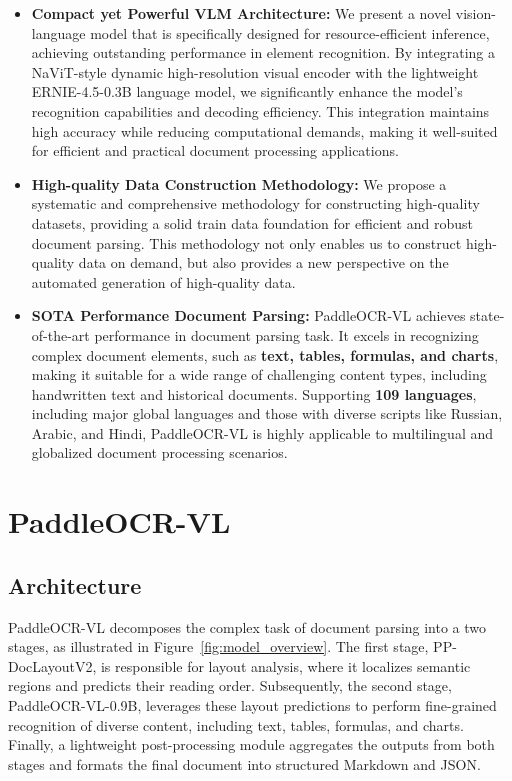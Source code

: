 \documentclass[11pt, a4paper,logo,  copyright, nonumbering]{paddleocr}
\begin{document}
\begin{itemize}

    \item \textbf{Compact yet Powerful VLM Architecture:} We present a novel vision-language model that is specifically designed for resource-efficient inference, achieving outstanding performance in element recognition. By integrating a NaViT-style dynamic high-resolution visual encoder with the lightweight ERNIE-4.5-0.3B language model, we significantly enhance the model’s recognition capabilities and decoding efficiency. This integration maintains high accuracy while reducing computational demands, making it well-suited for efficient and practical document processing applications.

    \item \textbf{High-quality Data Construction Methodology:} We propose a systematic and comprehensive methodology for constructing high-quality datasets, providing a solid train data foundation for efficient and robust document parsing. This methodology not only enables us to construct high-quality data on demand, but also provides a new perspective on the automated generation of high-quality data.

    \item \textbf{SOTA Performance Document Parsing:} PaddleOCR-VL achieves state-of-the-art performance in document parsing task. It excels in recognizing complex document elements, such as \textbf{text, tables, formulas, and charts}, making it suitable for a wide range of challenging content types, including handwritten text and historical documents. Supporting \textbf{109 languages}, including major global languages and those with diverse scripts like Russian, Arabic, and Hindi, PaddleOCR-VL is highly applicable to multilingual and globalized document processing scenarios. 



\end{itemize}


\section{PaddleOCR-VL}

\subsection{Architecture}
\label{Architecture PaddleOCR-VL}

PaddleOCR-VL decomposes the complex task of document parsing into a two stages, as illustrated in Figure~\ref{fig:model_overview}. The first stage, PP-DocLayoutV2, is responsible for layout analysis, where it localizes semantic regions and predicts their reading order. Subsequently, the second stage, PaddleOCR-VL-0.9B, leverages these layout predictions to perform fine-grained recognition of diverse content, including text, tables, formulas, and charts. Finally, a lightweight post-processing module aggregates the outputs from both stages and formats the final document into structured Markdown and JSON.
\end{document}
